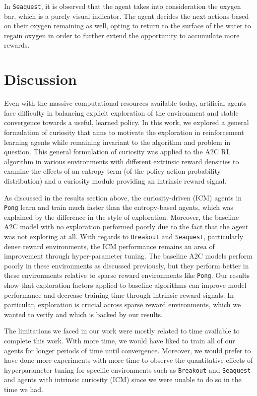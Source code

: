 \documentclass{article}
\begin{document}
In \texttt{Seaquest}, it is observed that the agent takes into consideration the oxygen bar, which is a purely visual indicator. The agent decides the next actions based on their oxygen remaining as well, opting to return to the surface of the water to regain oxygen in order to further extend the opportunity to accumulate more rewards.

\section{Discussion}
Even with the massive computational resources available today, artificial agents face difficulty in balancing explicit exploration of the environment and stable convergence towards a useful, learned policy. In this work, we explored a general formulation of curiosity that aims to motivate the exploration in reinforcement learning agents while remaining invariant to the algorithm and problem in question. This general formulation of curiosity was applied to the A2C RL algorithm in various environments with different extrinsic reward densities to examine the effects of an entropy term (of the policy action probability distribution) and a curiosity module providing an intrinsic reward signal.

As discussed in the results section above, the curiosity-driven (ICM) agents in \texttt{Pong} learn and train much faster than the entropy-based agents, which was explained by the difference in the style of exploration. Moreover, the baseline A2C model with no exploration performed poorly due to the fact that the agent was not exploring at all. With regards to \texttt{Breakout} and \texttt{Seaquest}, particularly dense reward environments, the ICM performance remains an area of improvement through hyper-parameter tuning. The baseline A2C models perform poorly in these environments as discussed previously, but they perform better in these environments relative to sparse reward environments like \texttt{Pong}. Our results show that exploration factors applied to baseline algorithms can improve model performance and decrease training time through intrinsic reward signals. In particular, exploration is crucial across sparse reward environments, which we wanted to verify and which is backed by our results.

The limitations we faced in our work were mostly related to time available to complete this work. With more time, we would have liked to train all of  our agents for longer periods of time until convergence. Moreover, we would prefer to have done more experiments with more time to observe the quantitative effects of hyperparameter tuning for specific environments such as \texttt{Breakout} and \texttt{Seaquest} and agents with intrinsic curiosity (ICM) since we were unable to do so in the time we had. 
\end{document}
